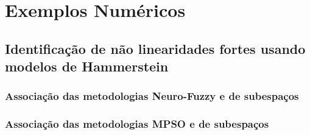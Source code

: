\chapter{Exemplos Numéricos}
%
\label{cap:exem} 
%
\section{Identificação de não linearidades fortes usando modelos de Hammerstein} 
%
\label{sec:exem_ident}
%

%
\subsection{Associação das metodologias Neuro-Fuzzy e de subespaços}
%
\label{subsec:exem_NF+Subspace}
%

%
\subsection{Associação das metodologias MPSO e de subespaços} 
%
\label{subsec:exem_MPSO+Subspace}
%

%
\clearpage
%